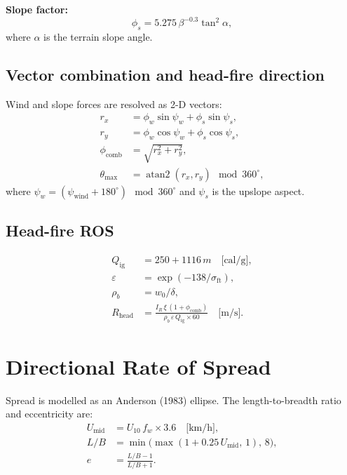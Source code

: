 \documentclass[11pt,twocolumn]{article}
\begin{document}
\textbf{Slope factor:}
\begin{equation}
  \phi_s = 5.275\,\beta^{-0.3}\tan^2\!\alpha,\label{eq:phis}
\end{equation}
where $\alpha$ is the terrain slope angle.

\subsection{Vector combination and head-fire direction}

Wind and slope forces are resolved as 2-D vectors:
\begin{align}
  r_x &= \phi_w\sin\psi_w + \phi_s\sin\psi_s,\label{eq:rx}\\
  r_y &= \phi_w\cos\psi_w + \phi_s\cos\psi_s,\label{eq:ry}\\
  \phi_{\mathrm{comb}} &= \sqrt{r_x^2+r_y^2},\label{eq:phicomb}\\
  \theta_{\max} &= \operatorname{atan2}(r_x,r_y)\mod 360^\circ,\label{eq:thetamax}
\end{align}
where $\psi_w = (\psi_{\mathrm{wind}}+180^\circ)\mod360^\circ$ and
$\psi_s$ is the upslope aspect.

\subsection{Head-fire ROS}

\begin{align}
  Q_{\mathrm{ig}} &= 250 + 1116\,m\quad\text{[cal/g]},\label{eq:Qig}\\
  \varepsilon &= \exp(-138/\sigma_{\mathrm{ft}}),\label{eq:eps}\\
  \rho_b &= w_0/\delta,\label{eq:rhob}\\
  R_{\mathrm{head}} &= \frac{I_R\,\xi\,(1+\phi_{\mathrm{comb}})}
                          {\rho_b\,\varepsilon\,Q_{\mathrm{ig}}\times60}
                    \quad\text{[m/s]}.\label{eq:Rhead}
\end{align}

\section{Directional Rate of Spread}
\label{sec:directional}

Spread is modelled as an Anderson (1983) ellipse.  The
length-to-breadth ratio and eccentricity are:
\begin{align}
  U_{\mathrm{mid}} &= U_{10}\,f_w\times3.6\quad\text{[km/h]},\label{eq:umid}\\
  L/B &= \min\!\bigl(\max(1+0.25\,U_{\mathrm{mid}},\,1),\,8\bigr),\label{eq:lb}\\
  e &= \frac{L/B-1}{L/B+1}.\label{eq:e}
\end{align}
\end{document}
